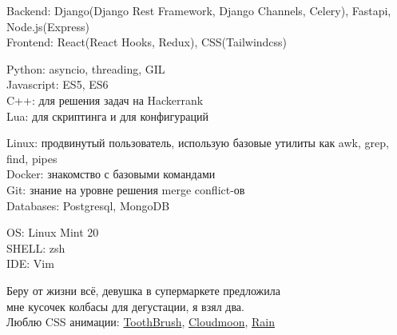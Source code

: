 \documentclass[10pt]{article} %
\begin{document}
{
  Backend: Django(Django Rest Framework, Django Channels, Celery), Fastapi, Node.js(Express)\\
  Frontend: React(React Hooks, Redux), CSS(Tailwindcss)
}

{
  Python: asyncio, threading, GIL\\
  Javascript: ES5, ES6\\
  C++: для решения задач на Hackerrank\\
  Lua: для скриптинга и для конфигураций
}

{
  Linux: продвинутый пользователь, использую базовые утилиты как awk, grep, find, pipes\\
  Docker: знакомство с базовыми командами\\
  Git: знание на уровне решения merge conflict-ов\\
  Databases: Postgresql, MongoDB
}


{
  OS: Linux Mint 20\\
  SHELL: zsh\\
  IDE: Vim
}

{
  Беру от жизни всё, девушка в супермаркете предложила \\ 
  мне кусочек колбасы для дегустации, я взял два. \\ 
  Люблю CSS анимации: \href{https://kuator.github.io/gh-pages/image-reveal-kinda}{ToothBrush},
    \href{https://kuator.github.io/gh-pages/cloudmoon}{Cloudmoon},
    \href{https://kuator.github.io/gh-pages/rain/}{Rain}
}
\end{document}
